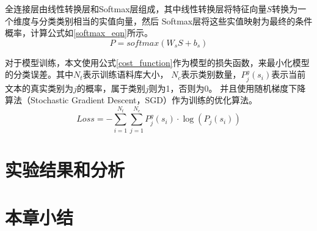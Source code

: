 全连接层由线性转换层和Softmax层组成，其中线性转换层将特征向量$S$转换为一个维度与分类类别相当的实值向量，然后
Softmax层将这些实值映射为最终的条件概率，计算公式如\ref{softmax_eqn}所示。
\begin{equation}
    P=softmax\left ( W_sS+b_s \right )
    \label{softmax_eqn}
\end{equation}

对于模型训练，本文使用公式\ref{cost_function}作为模型的损失函数，来最小化模型的分类误差。其中$N_t$表示训练语料库大小，
$N_c$表示类别数量，$P_{j}^{g}\left ( s_i \right )$表示当前文本的真实类别为$j$的概率，属于类别$j$则为1，否则为0。
并且使用随机梯度下降算法（Stochastic Gradient Descent，SGD）作为训练的优化算法。
\begin{equation}
    Loss=-\sum_{i=1}^{N_t}\sum_{j=1}^{N_c}P_{j}^{g}\left ( s_i \right )\cdot\log\left ( P_j\left ( s_i \right ) \right )
    \label{cost_function}
\end{equation}
\section{实验结果和分析}
\section{本章小结}